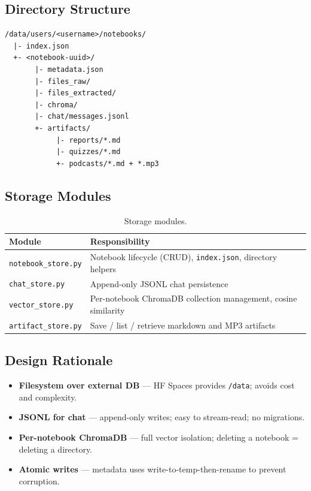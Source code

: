 \documentclass[11pt, letterpaper]{article}
\begin{document}
\subsection{Directory Structure}

\begin{lstlisting}
/data/users/<username>/notebooks/
  |- index.json
  +- <notebook-uuid>/
       |- metadata.json
       |- files_raw/
       |- files_extracted/
       |- chroma/
       |- chat/messages.jsonl
       +- artifacts/
            |- reports/*.md
            |- quizzes/*.md
            +- podcasts/*.md + *.mp3
\end{lstlisting}

\subsection{Storage Modules}

\begin{table}[H]
\centering\small
\begin{tabularx}{\textwidth}{@{}l X@{}}
\toprule
\textbf{Module} & \textbf{Responsibility} \\
\midrule
\texttt{notebook\_store.py} & Notebook lifecycle (CRUD), \texttt{index.json}, directory helpers \\
\texttt{chat\_store.py}     & Append-only JSONL chat persistence \\
\texttt{vector\_store.py}   & Per-notebook ChromaDB collection management, cosine similarity \\
\texttt{artifact\_store.py} & Save / list / retrieve markdown and MP3 artifacts \\
\bottomrule
\end{tabularx}
\caption{Storage modules.}
\end{table}

\subsection{Design Rationale}

\begin{itemize}
    \item \textbf{Filesystem over external DB} --- HF Spaces provides \texttt{/data}; avoids cost and complexity.
    \item \textbf{JSONL for chat} --- append-only writes; easy to stream-read; no migrations.
    \item \textbf{Per-notebook ChromaDB} --- full vector isolation; deleting a notebook = deleting a directory.
    \item \textbf{Atomic writes} --- metadata uses write-to-temp-then-rename to prevent corruption.
\end{itemize}
\end{document}
